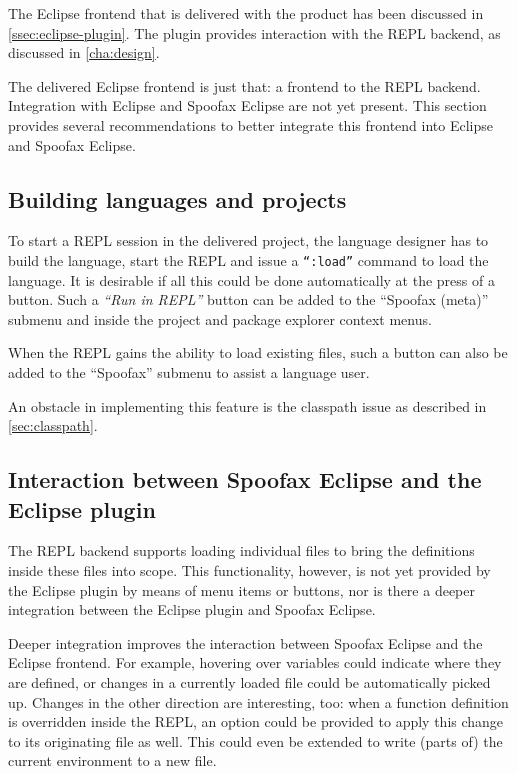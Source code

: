 The Eclipse frontend that is delivered with the product has been discussed in
\cref{ssec:eclipse-plugin}. The plugin provides interaction with the REPL
backend, as discussed in \cref{cha:design}.

The delivered Eclipse frontend is just that: a frontend to the REPL backend.
Integration with Eclipse and Spoofax Eclipse are not yet present. This
section provides several recommendations to better integrate this frontend
into Eclipse and Spoofax Eclipse.

\subsection{Building languages and projects}

To start a REPL session in the delivered project, the language designer has to
build the language, start the REPL and issue a \texttt{``:load''} command to
load the language. It is desirable if all this could be done automatically at
the press of a button. Such a \textit{``Run in REPL''} button can be added to the
``Spoofax (meta)'' submenu and inside the project and package explorer context
menus.

When the REPL gains the ability to load existing files, such a button can also
be added to the ``Spoofax'' submenu to assist a language user.

An obstacle in implementing this feature is the classpath issue as described in
\cref{sec:classpath}.

\subsection{Interaction between Spoofax Eclipse and the Eclipse plugin}

The REPL backend supports loading individual files to bring the definitions
inside these files into scope. This functionality, however, is not yet provided
by the Eclipse plugin by means of menu items or buttons, nor is there a deeper integration
between the Eclipse plugin and Spoofax Eclipse.

Deeper integration improves the interaction between Spoofax Eclipse and the
Eclipse frontend. For example, hovering over variables could indicate where they are defined, or
changes in a currently loaded file could be automatically picked up. Changes in
the other direction are interesting, too: when a function definition is overridden
inside the REPL, an option could be provided to apply this change to its
originating file as well. This could even be extended to write (parts of) the current
environment to a new file.

